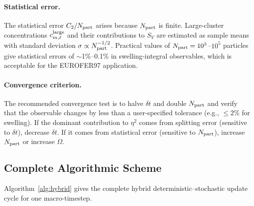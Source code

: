 \documentclass[pdflatex,sn-basic]{sn-jnl} %
\begin{document}
\paragraph{Statistical error.}
The statistical error $C_2/N_{\rm part}$ arises because $N_{\rm part}$
is finite.  Large-cluster concentrations $c_{m,\ell}^{\rm large}$ and
their contributions to $S_V$ are estimated as sample means with
standard deviation $\sigma \propto N_{\rm part}^{-1/2}$.  Practical
values of $N_{\rm part} = 10^3$--$10^5$ particles give statistical
errors of $\sim$1\%--0.1\% in swelling-integral observables, which
is acceptable for the EUROFER97 application.

\paragraph{Convergence criterion.}
The recommended convergence test is to halve $\delta t$ and double
$N_{\rm part}$ and verify that the observable changes by less than a
user-specified tolerance (e.g., $\leq 2\%$ for swelling).  If the
dominant contribution to $\eta^2$ comes from splitting error
(sensitive to $\delta t$), decrease $\delta t$.  If it comes from
statistical error (sensitive to $N_{\rm part}$), increase
$N_{\rm part}$ or increase $\Omega$.

\subsection{Complete Algorithmic Scheme}
\label{sec:hybrid_algorithm}

Algorithm~\ref{alg:hybrid} gives the complete hybrid
deterministic--stochastic update cycle for one macro-timestep.
\end{document}
